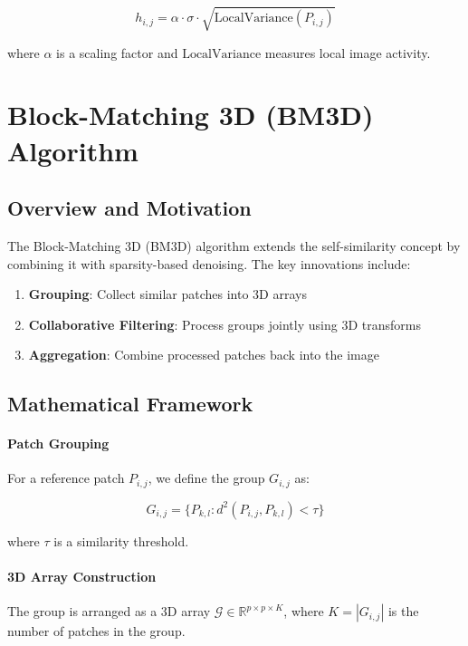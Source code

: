 \documentclass[12pt]{article}
\begin{document}
\begin{equation}
    h_{i,j} = \alpha \cdot \sigma \cdot \sqrt{\text{LocalVariance}(P_{i,j})}
\end{equation}

where $\alpha$ is a scaling factor and $\text{LocalVariance}$ measures local image activity.

\newpage

\section{Block-Matching 3D (BM3D) Algorithm}
\label{sec:bm3d}

\subsection{Overview and Motivation}
\label{subsec:bm3d_overview}

The Block-Matching 3D (BM3D) algorithm extends the self-similarity concept by combining it with sparsity-based denoising. The key innovations include:

\begin{enumerate}
    \item \textbf{Grouping}: Collect similar patches into 3D arrays
    \item \textbf{Collaborative Filtering}: Process groups jointly using 3D transforms
    \item \textbf{Aggregation}: Combine processed patches back into the image
\end{enumerate}

\subsection{Mathematical Framework}
\label{subsec:bm3d_framework}

\paragraph{Patch Grouping}
For a reference patch $P_{i,j}$, we define the group $G_{i,j}$ as:

\begin{equation}
    \label{eq:group_definition}
    G_{i,j} = \{P_{k,l} : d^2(P_{i,j}, P_{k,l}) < \tau\}
\end{equation}

where $\tau$ is a similarity threshold.

\paragraph{3D Array Construction}
The group is arranged as a 3D array $\mathcal{G} \in \mathbb{R}^{p \times p \times K}$, where $K = |G_{i,j}|$ is the number of patches in the group.
\end{document}
